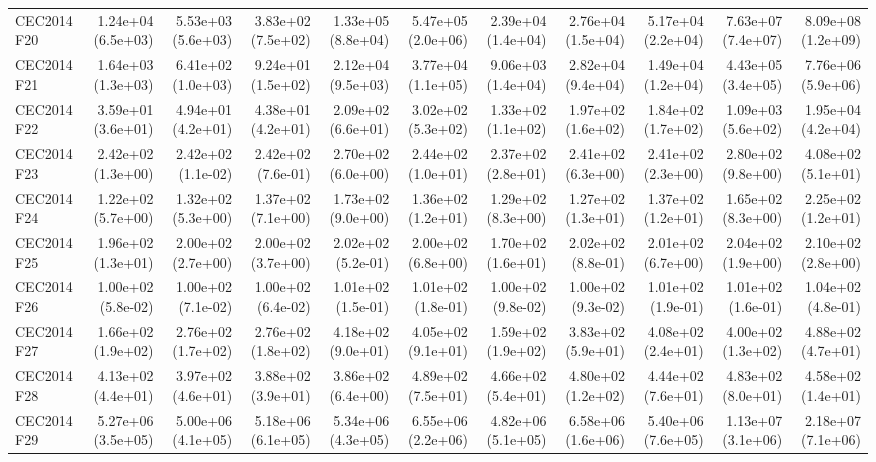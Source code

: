\begin{longtable}{lrrrrrrrrrr}
CEC2014 F20 & 1.24e+04 (6.5e+03) & 5.53e+03 (5.6e+03) & 3.83e+02 (7.5e+02) & 1.33e+05 (8.8e+04) & 5.47e+05 (2.0e+06) & 2.39e+04 (1.4e+04) & 2.76e+04 (1.5e+04) & 5.17e+04 (2.2e+04) & 7.63e+07 (7.4e+07) & 8.09e+08 (1.2e+09) \\
CEC2014 F21 & 1.64e+03 (1.3e+03) & 6.41e+02 (1.0e+03) & 9.24e+01 (1.5e+02) & 2.12e+04 (9.5e+03) & 3.77e+04 (1.1e+05) & 9.06e+03 (1.4e+04) & 2.82e+04 (9.4e+04) & 1.49e+04 (1.2e+04) & 4.43e+05 (3.4e+05) & 7.76e+06 (5.9e+06) \\
CEC2014 F22 & 3.59e+01 (3.6e+01) & 4.94e+01 (4.2e+01) & 4.38e+01 (4.2e+01) & 2.09e+02 (6.6e+01) & 3.02e+02 (5.3e+02) & 1.33e+02 (1.1e+02) & 1.97e+02 (1.6e+02) & 1.84e+02 (1.7e+02) & 1.09e+03 (5.6e+02) & 1.95e+04 (4.2e+04) \\
CEC2014 F23 & 2.42e+02 (1.3e+00) & 2.42e+02 (1.1e-02) & 2.42e+02 (7.6e-01) & 2.70e+02 (6.0e+00) & 2.44e+02 (1.0e+01) & 2.37e+02 (2.8e+01) & 2.41e+02 (6.3e+00) & 2.41e+02 (2.3e+00) & 2.80e+02 (9.8e+00) & 4.08e+02 (5.1e+01) \\
CEC2014 F24 & 1.22e+02 (5.7e+00) & 1.32e+02 (5.3e+00) & 1.37e+02 (7.1e+00) & 1.73e+02 (9.0e+00) & 1.36e+02 (1.2e+01) & 1.29e+02 (8.3e+00) & 1.27e+02 (1.3e+01) & 1.37e+02 (1.2e+01) & 1.65e+02 (8.3e+00) & 2.25e+02 (1.2e+01) \\
CEC2014 F25 & 1.96e+02 (1.3e+01) & 2.00e+02 (2.7e+00) & 2.00e+02 (3.7e+00) & 2.02e+02 (5.2e-01) & 2.00e+02 (6.8e+00) & 1.70e+02 (1.6e+01) & 2.02e+02 (8.8e-01) & 2.01e+02 (6.7e+00) & 2.04e+02 (1.9e+00) & 2.10e+02 (2.8e+00) \\
CEC2014 F26 & 1.00e+02 (5.8e-02) & 1.00e+02 (7.1e-02) & 1.00e+02 (6.4e-02) & 1.01e+02 (1.5e-01) & 1.01e+02 (1.8e-01) & 1.00e+02 (9.8e-02) & 1.00e+02 (9.3e-02) & 1.01e+02 (1.9e-01) & 1.01e+02 (1.6e-01) & 1.04e+02 (4.8e-01) \\
CEC2014 F27 & 1.66e+02 (1.9e+02) & 2.76e+02 (1.7e+02) & 2.76e+02 (1.8e+02) & 4.18e+02 (9.0e+01) & 4.05e+02 (9.1e+01) & 1.59e+02 (1.9e+02) & 3.83e+02 (5.9e+01) & 4.08e+02 (2.4e+01) & 4.00e+02 (1.3e+02) & 4.88e+02 (4.7e+01) \\
CEC2014 F28 & 4.13e+02 (4.4e+01) & 3.97e+02 (4.6e+01) & 3.88e+02 (3.9e+01) & 3.86e+02 (6.4e+00) & 4.89e+02 (7.5e+01) & 4.66e+02 (5.4e+01) & 4.80e+02 (1.2e+02) & 4.44e+02 (7.6e+01) & 4.83e+02 (8.0e+01) & 4.58e+02 (1.4e+01) \\
CEC2014 F29 & 5.27e+06 (3.5e+05) & 5.00e+06 (4.1e+05) & 5.18e+06 (6.1e+05) & 5.34e+06 (4.3e+05) & 6.55e+06 (2.2e+06) & 4.82e+06 (5.1e+05) & 6.58e+06 (1.6e+06) & 5.40e+06 (7.6e+05) & 1.13e+07 (3.1e+06) & 2.18e+07 (7.1e+06) \\

\end{longtable}
